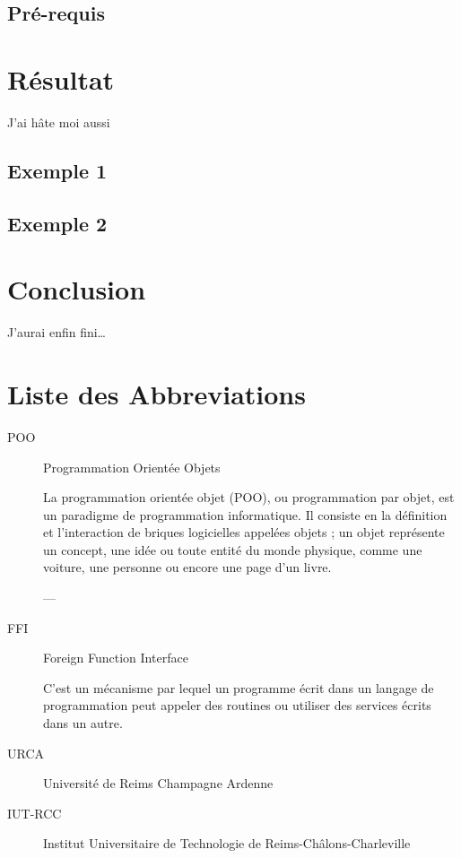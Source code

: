 \documentclass[11pt,a4paper,krantz2,11pt,oneside]{krantz}
\begin{document}
\hypertarget{utils-pre-requis}{%
\section{Pré-requis}\label{utils-pre-requis}}

\hypertarget{res}{%
\chapter{Résultat}\label{res}}

J'ai hâte moi aussi

\hypertarget{exemple-1}{%
\section{Exemple 1}\label{exemple-1}}

\hypertarget{exemple-2}{%
\section{Exemple 2}\label{exemple-2}}

\hypertarget{conclusion}{%
\chapter*{Conclusion}\label{conclusion}}


J'aurai enfin fini\ldots{}

\hypertarget{liste-des-abbreviations}{%
\chapter*{Liste des Abbreviations}\label{liste-des-abbreviations}}


\begin{description}
\item[POO]
Programmation Orientée Objets

La programmation orientée objet (POO), ou programmation par objet, est un paradigme de programmation informatique. Il consiste en la définition et l'interaction de briques logicielles appelées objets ; un objet représente un concept, une idée ou toute entité du monde physique, comme une voiture, une personne ou encore une page d'un livre.

--- \citep{wikipedia_programmation_2020}
\item[FFI]
Foreign Function Interface

C'est un mécanisme par lequel un programme écrit dans un langage de programmation peut appeler des routines ou utiliser des services écrits dans un autre.
\item[URCA]
Université de Reims Champagne Ardenne
\item[IUT-RCC]
Institut Universitaire de Technologie de Reims-Châlons-Charleville
\end{description}

\backmatter



\printindex
\end{document}
